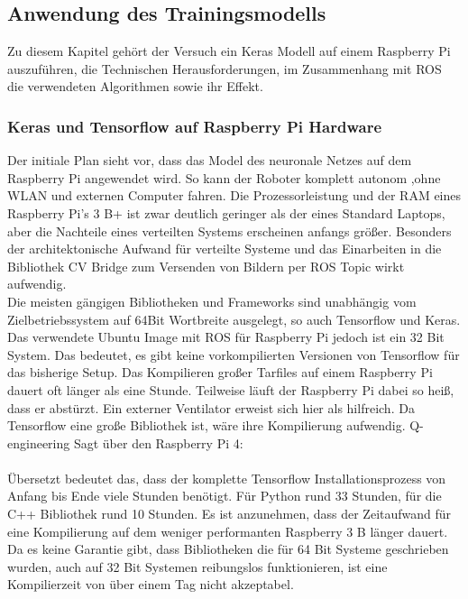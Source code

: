 \documentclass[conference]{IEEEtran}
\begin{document}
	
	\subsection{Anwendung des Trainingsmodells} %
	Zu diesem Kapitel gehört der Versuch ein Keras Modell auf einem 
	Raspberry Pi auszuführen, die Technischen Herausforderungen, im 
	Zusammenhang mit ROS  die verwendeten Algorithmen sowie ihr Effekt. 
	
	\subsubsection{Keras und Tensorflow auf Raspberry Pi Hardware}
	Der initiale Plan sieht vor, dass das Model des neuronale Netzes auf dem 
	Raspberry Pi 
	angewendet wird. So kann der Roboter komplett autonom ,ohne WLAN 
	und externen Computer fahren. Die Prozessorleistung und der RAM 
	eines Raspberry Pi's 3 B+ ist zwar deutlich geringer als der eines 
	Standard Laptops, aber die Nachteile eines verteilten Systems erscheinen 
	anfangs größer. Besonders der architektonische Aufwand für verteilte 
	Systeme und das Einarbeiten in die Bibliothek CV Bridge zum Versenden 
	von Bildern per ROS Topic wirkt aufwendig. \\
	Die meisten gängigen Bibliotheken und Frameworks sind unabhängig vom 
	Zielbetriebssystem auf 64Bit Wortbreite ausgelegt, so auch Tensorflow 
	und Keras. Das verwendete Ubuntu Image mit ROS für Raspberry Pi 
	jedoch ist ein 32 Bit System. Das bedeutet, es gibt keine vorkompilierten 
	Versionen von Tensorflow für das bisherige Setup. Das Kompilieren 
	großer Tarfiles auf einem Raspberry Pi dauert oft länger als eine Stunde. 
	Teilweise läuft der Raspberry Pi dabei so heiß, dass er abstürzt. Ein 
	externer Ventilator erweist sich hier als hilfreich. Da Tensorflow eine große 
	Bibliothek ist, wäre ihre Kompilierung aufwendig.
Q-engineering	\cite{qengineering}
	Sagt über den Raspberry Pi 4: \\
	 \\
	Übersetzt bedeutet das, dass der komplette Tensorflow Installationsprozess von Anfang bis Ende viele Stunden benötigt. Für Python rund 33 Stunden, für die C++ 
	Bibliothek rund 10 Stunden.
	Es ist anzunehmen, dass der Zeitaufwand für eine Kompilierung auf dem 
	weniger performanten Raspberry 3 B länger dauert. Da es keine Garantie 
	gibt, dass Bibliotheken die für 64 Bit Systeme geschrieben wurden, auch 
	auf 32 Bit Systemen reibungslos funktionieren, ist eine Kompilierzeit 
	von über einem Tag nicht akzeptabel. \\
	
\end{document}
